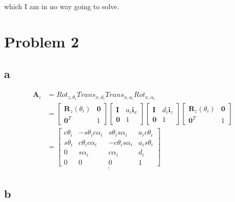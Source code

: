 \documentclass{article}
\begin{document}
which I am in no way going to solve.


\section{Problem 2}

\subsection{a}

\begin{align*}
    \mathbf{A}_i &= Rot_{z,\theta_i} Trans_{x,d_i} Trans_{x,a_i} Rot_{x,\alpha_i}\\
                 &=\begin{bmatrix} 
                    \mathbf{R}_z(\theta_i) & \mathbf{0} \\
                    \mathbf{0}^T & 1
                    \end{bmatrix}
                    \begin{bmatrix}
                    \mathbf{I} & a_i\mathbf{i}_x\\
                    \mathbf{0} & 1
                    \end{bmatrix}
                    \begin{bmatrix}
                    \mathbf{I} & d_i\mathbf{i}_z \\
                    \mathbf{0} & 1
                    \end{bmatrix}
                    \begin{bmatrix} 
                    \mathbf{R}_z(\theta_i) & \mathbf{0} \\
                    \mathbf{0}^T & 1
                    \end{bmatrix} \\
                 &=\underline{\underline{
                 \begin{bmatrix}
                    c\theta_i  & -s\theta_ic\alpha_i & s\theta_is\alpha_i & a_ic\theta_i \\
                    s\theta_i  & c\theta_ic\alpha_i & -c\theta_is\alpha_i & a_is\theta_i \\
                    0  & s\alpha_i & c\alpha_i & d_i \\
                    0  & 0 & 0 & 1
                 \end{bmatrix}}}
\end{align*}



\subsection{b}
\end{document}
